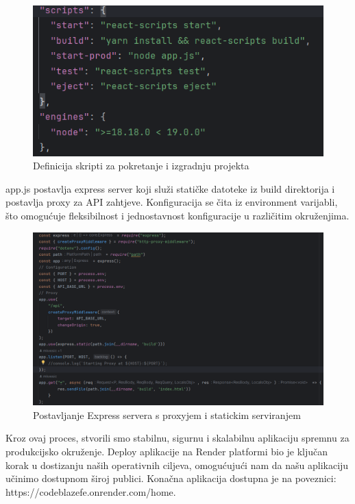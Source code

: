 		\begin{figure} [H]
			\centering
			\includegraphics[width=0.7\linewidth]{slike/package.png}
			\caption{Definicija skripti za pokretanje i izgradnju projekta}
			\label{fig:Definicija skripti za pokretanje i izgradnju projekta}
		\end{figure}

		app.js postavlja express server koji služi statičke datoteke iz build direktorija i postavlja proxy za API zahtjeve. Konfiguracija se čita iz environment varijabli, što omogućuje fleksibilnost i jednostavnost konfiguracije u različitim okruženjima.

		\begin{figure} [H]
			\centering
			\includegraphics[width=0.7\linewidth]{slike/app.png}
			\caption{Postavljanje Express servera s proxyjem i statickim serviranjem}
			\label{fig:Postavljanje Express servera s proxyjem i statickim serviranjem}
		\end{figure}

		Kroz ovaj proces, stvorili smo stabilnu, sigurnu i skalabilnu aplikaciju spremnu za produkcijsko okruženje. Deploy aplikacije na Render platformi bio je ključan korak u dostizanju naših operativnih ciljeva, omogućujući nam da našu aplikaciju učinimo dostupnom široj publici. Konačna aplikacija dostupna je na poveznici: https://codeblazefe.onrender.com/home.


		\eject